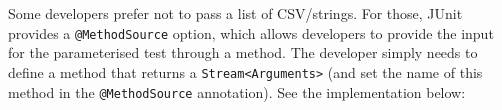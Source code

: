 Some developers prefer not to pass a list of CSV/strings. For those,
JUnit provides a \texttt{@MethodSource} option, which allows developers
to provide the input for the parameterised test through a method. The
developer simply needs to define a method that returns a
\texttt{Stream\textless{}Arguments\textgreater{}} (and set the name of
this method in the \texttt{@MethodSource} annotation). See the
implementation below:

\begin{Shaded}
\begin{Highlighting}[]
 

    \NormalTok{)}
    \NormalTok{(}\NormalTok{)}
     \NormalTok{(}
         
\NormalTok{    \}}


\end{Highlighting}
\end{Shaded}
